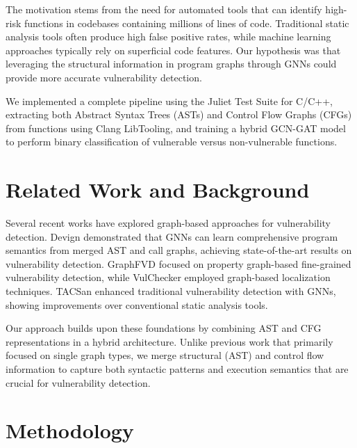 The motivation stems from the need for automated tools that can identify high-risk functions in codebases containing millions of lines of code. Traditional static analysis tools often produce high false positive rates, while machine learning approaches typically rely on superficial code features. Our hypothesis was that leveraging the structural information in program graphs through GNNs could provide more accurate vulnerability detection.

We implemented a complete pipeline using the Juliet Test Suite for C/C++, extracting both Abstract Syntax Trees (ASTs) and Control Flow Graphs (CFGs) from functions using Clang LibTooling, and training a hybrid GCN-GAT model to perform binary classification of vulnerable versus non-vulnerable functions.

\section{Related Work and Background}

Several recent works have explored graph-based approaches for vulnerability detection. Devign \cite{devign} demonstrated that GNNs can learn comprehensive program semantics from merged AST and call graphs, achieving state-of-the-art results on vulnerability detection. GraphFVD \cite{graphfvd} focused on property graph-based fine-grained vulnerability detection, while VulChecker \cite{vulchecker} employed graph-based localization techniques. TACSan \cite{tacsan} enhanced traditional vulnerability detection with GNNs, showing improvements over conventional static analysis tools.

Our approach builds upon these foundations by combining AST and CFG representations in a hybrid architecture. Unlike previous work that primarily focused on single graph types, we merge structural (AST) and control flow information to capture both syntactic patterns and execution semantics that are crucial for vulnerability detection.

\section{Methodology}


